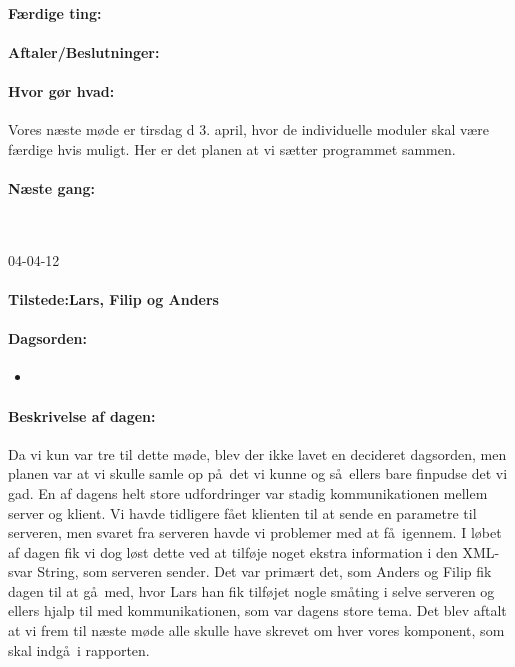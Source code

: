 \documentclass[a4paper,10pt,titlepage]{article}
\begin{document}
		\paragraph{F\ae rdige ting:}
		
		\paragraph{Aftaler/Beslutninger:}
		
		\paragraph{Hvor g\o r hvad:}
		Vores n\ae ste m\o de er tirsdag d 3. april, hvor de individuelle moduler skal v\ae re f\ae rdige hvis muligt. Her er det planen at vi s\ae tter programmet sammen.
		\paragraph{N\ae ste gang:}\mbox{}\\
		
		\begin{center}
		04-04-12
		\end{center}
		
		\paragraph{Tilstede:Lars, Filip og Anders}
		\paragraph{Dagsorden:}
		\begin{itemize}
					\item 
					
		\end{itemize}
		
		\paragraph{Beskrivelse af dagen:}
		Da vi kun var tre til dette m\o de, blev der ikke lavet en decideret dagsorden, men planen var at vi skulle samle op p\aa \ det vi kunne og s\aa \ ellers bare finpudse det vi gad. En af dagens helt store udfordringer var stadig kommunikationen mellem server og klient. Vi havde tidligere f\aa et klienten til at sende en parametre til serveren, men svaret fra serveren havde vi problemer med at f\aa \ igennem. I l\o bet af dagen fik vi dog l\o st dette ved at tilf\o je noget ekstra information i den XML-svar String, som serveren sender. Det var prim\ae rt det, som Anders og Filip fik dagen til at g\aa \ med, hvor Lars han fik tilf\o jet nogle sm\aa ting i selve serveren og ellers hjalp til med kommunikationen, som var dagens store tema. Det blev aftalt at vi frem til n\ae ste m\o de alle skulle have skrevet om hver vores komponent, som skal indg\aa \ i rapporten. 
\end{document}
